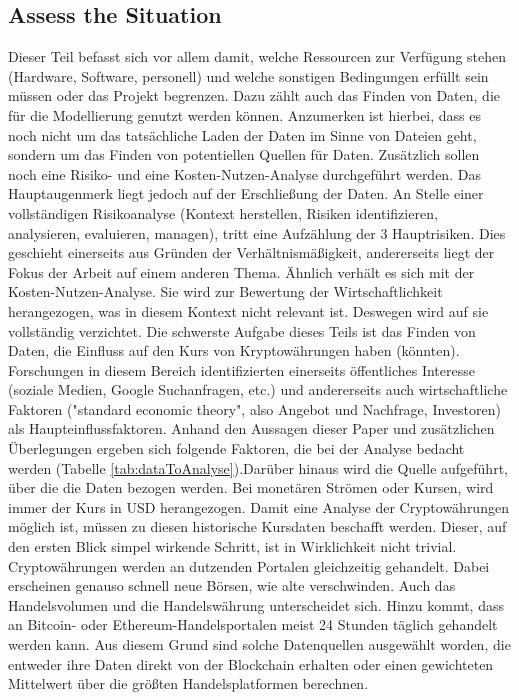 \subsection{Assess the Situation}
Dieser Teil befasst sich vor allem damit, welche Ressourcen zur Verfügung stehen (Hardware, Software, personell) und welche sonstigen Bedingungen erfüllt sein müssen oder das Projekt begrenzen. Dazu zählt auch das Finden von Daten, die für die Modellierung genutzt werden können. Anzumerken ist hierbei, dass es noch nicht um das tatsächliche Laden der Daten im Sinne von Dateien geht, sondern um das Finden von potentiellen Quellen für Daten. Zusätzlich sollen noch eine Risiko- und eine Kosten-Nutzen-Analyse durchgeführt werden. Das Hauptaugenmerk liegt jedoch auf der Erschließung der Daten. 
\newline
An Stelle einer vollständigen Risikoanalyse (Kontext herstellen, Risiken identifizieren, analysieren, evaluieren, managen\citep[S.~43]{sowa_management_2017}), tritt eine Aufzählung der 3 Hauptrisiken. Dies geschieht einerseits aus Gründen der Verhältnismäßigkeit, andererseits liegt der Fokus der Arbeit auf einem anderen Thema. Ähnlich verhält es sich mit der Kosten-Nutzen-Analyse. Sie wird zur Bewertung der Wirtschaftlichkeit herangezogen, was in diesem Kontext nicht relevant ist. Deswegen wird auf sie vollständig verzichtet.
\newline
Die schwerste Aufgabe dieses Teils ist das Finden von Daten, die Einfluss auf den Kurs von Kryptowährungen haben (könnten). Forschungen in diesem Bereich identifizierten einerseits öffentliches Interesse (soziale Medien, Google Suchanfragen, etc.) und andererseits auch wirtschaftliche Faktoren ("standard economic theory", also Angebot und Nachfrage, Investoren)\citep{kristoufek_what_2015} als Haupteinflussfaktoren. Anhand den Aussagen dieser Paper und zusätzlichen Überlegungen ergeben sich folgende Faktoren, die bei der Analyse bedacht werden (Tabelle \ref{tab:dataToAnalyse}).\newline Darüber hinaus wird die Quelle aufgeführt, über die die Daten bezogen werden. Bei monetären Strömen oder Kursen, wird immer der Kurs in USD herangezogen. 
\newline
Damit eine Analyse der Cryptowährungen möglich ist, müssen zu diesen historische Kursdaten beschafft werden. Dieser, auf den ersten Blick simpel wirkende Schritt, ist in Wirklichkeit  nicht trivial. Cryptowährungen werden an dutzenden Portalen gleichzeitig gehandelt. Dabei erscheinen genauso schnell neue Börsen, wie alte verschwinden. Auch das Handelsvolumen und die Handelswährung unterscheidet sich. Hinzu kommt, dass an Bitcoin- oder Ethereum-Handelsportalen meist 24 Stunden täglich gehandelt werden kann. Aus diesem Grund sind solche Datenquellen ausgewählt worden, die entweder ihre Daten direkt von der Blockchain erhalten oder einen gewichteten Mittelwert über die größten Handelsplatformen berechnen.

